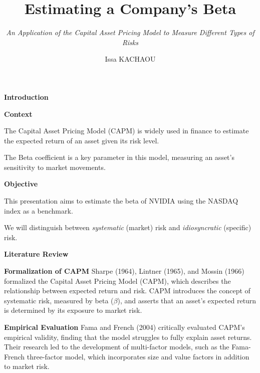 \documentclass{beamer}
\title{Estimating a Company's Beta}
\subtitle{\textit{An Application of the Capital Asset Pricing Model to Measure Different Types of Risks}}
\author{Issa KACHAOU}
\begin{document}
	
\begin{frame}[plain]
	\maketitle
\end{frame}

\begin{frame}{\textbf{Introduction}}

\begin{block}{\textbf{Context}}
	
	The Capital Asset Pricing Model (CAPM) is widely used in finance to estimate the expected return of an asset given its risk level.
	
	The Beta coefficient is a key parameter in this model, measuring an asset’s sensitivity to market movements.
\end{block}
\begin{block}{\textbf{Objective}}
	
	This presentation aims to estimate the beta of NVIDIA using the NASDAQ index as a benchmark.
	
	We will distinguish between \textit{systematic} (market) risk and \textit{idiosyncratic} (specific) risk.
\end{block}


\end{frame}
	
\begin{frame}{\textbf{Literature Review}}

\begin{block}{\textbf{Formalization of CAPM}}
	Sharpe (1964), Lintner (1965), and Mossin (1966) formalized the Capital Asset Pricing Model (CAPM), which describes the relationship between expected return and risk. CAPM introduces the concept of systematic risk, measured by beta (\(\beta\)), and asserts that an asset’s expected return is determined by its exposure to market risk.
\end{block}
	
\begin{block}{\textbf{Empirical Evaluation}}
	Fama and French (2004) critically evaluated CAPM’s empirical validity, finding that the model struggles to fully explain asset returns. Their research led to the development of multi-factor models, such as the Fama-French three-factor model, which incorporates size and value factors in addition to market risk.
\end{block}
	
\end{frame}
\end{document}
